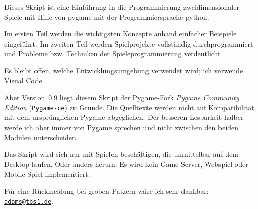 Dieses Skript ist eine Einführung in die Programmierung zweidimensionaler Spiele mit Hilfe von \Gls{pygame} mit der Programmiersprache \Gls{python}. 

Im ersten Teil werden die wichtigsten Konzepte anhand einfacher Beispiele eingeführt. Im zweiten Teil werden Spielprojekte vollständig durchprogrammiert und Probleme bzw. Techniken der Spieleprogrammierung verdeutlicht.

Es bleibt offen, welche Entwicklungsumgebung verwendet wird; ich verwende Visual Code.

Aber Version~$0.9$ liegt diesem Skript der Pygame-Fork \emph{Pygame Community Edition} (\href{https://pyga.me/}{\nolinkurl{Pygame-ce}}) zu Grunde. Die Quelltexte werden nicht auf Kompatibilität mit dem ursprünglichen Pygame abgeglichen. Der besseren Lesbarkeit halber werde ich aber immer von Pygame sprechen und nicht zwischen den beiden Modulen unterscheiden.

Das Skript wird sich nur mit Spielen beschäftigen, die unmittelbar auf dem Desktop laufen. Oder anders herum: Es wird kein Game-Server, Webspiel oder Mobile-Spiel implementiert. 

Für eine Rückmeldung bei groben Patzern wäre ich sehr dankbar: \href{mailto:adams@tbs1.de}{\nolinkurl{adams@tbs1.de}}.



